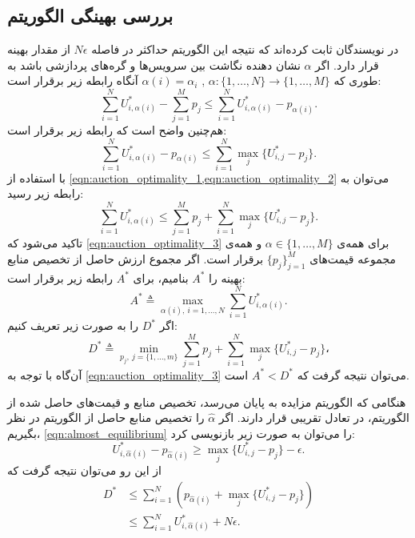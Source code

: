    \subsection{بررسی بهینگی الگوریتم}
      در \cite{distributed_auction_algorithms_zavlanos} نویسندگان ثابت کرده‌اند که نتیجه این الگوریتم حداکثر در فاصله $N\epsilon$ از مقدار بهینه قرار دارد.
      اگر $\alpha$ نشان دهنده نگاشت بین سرویس‌ها و گره‌های پردازشی باشد به طوری که $\alpha: \{1, \hdots, N\} \rightarrow \{1, \hdots, M\}$ , $\alpha(i) = \alpha_i$ آنگاه رابطه زیر برقرار است:
      \begin{equation}\label{eqn:auction_optimality_1}
        \sum_{i=1}^N U_{i,\alpha(i)}^* - \sum_{j=1}^M p_j \le \sum_{i=1}^N U_{i,\alpha(i)}^* - p_{\alpha(i)}.
      \end{equation}
      هم‌چنین واضح است که رابطه زیر برقرار است:
      \begin{equation}\label{eqn:auction_optimality_2}
        \sum_{i=1}^N U_{i,\alpha(i)}^* - p_{\alpha(i)} \le \sum_{i=1}^N \max_j\{U_{i,j}^* - p_j\}.
      \end{equation}
      با استفاده از \cref{eqn:auction_optimality_1,eqn:auction_optimality_2} می‌توان به رابطه زیر رسید:
      \begin{equation}\label{eqn:auction_optimality_3}
        \sum_{i=1}^N U_{i,\alpha(i)}^* \le \sum_{j=1}^M p_j + \sum_{i=1}^N \max_j\{U_{i,j}^* - p_j\}.
      \end{equation}
      تاکید می‌شود که \cref{eqn:auction_optimality_3} برای همه‌ی $\alpha \in \{1,\hdots,M\}$ و همه‌ی مجموعه قیمت‌های $\{p_j\}_{j=1}^M$ برقرار است.
      اگر مجموع ارزش حاصل از تخصیص منابع بهینه را $A^*$ بنامیم، برای $A^*$ رابطه زیر برقرار است:
      \begin{equation}\label{eqn:auction_optimality_A_defenition}
        A^* \triangleq \max_{\alpha(i),~i=1, \hdots, N} \sum_{i=1}^N U_{i, \alpha(i)}^*.
      \end{equation}
      اگر $D^*$ را به صورت زیر تعریف ‌کنیم:
      \begin{equation}\label{eqn:auction_optimality_D_defenition}
        D^* \triangleq \min_{p_j,~j=\{1, \hdots, m\}} \sum_{j=1}^M p_j + \sum_{i=1}^N \max_j\{U_{i,j}^* - p_j\}،
      \end{equation}
      آن‌گاه با توجه به \cref{eqn:auction_optimality_3} می‌توان نتیجه گرفت که $A^*<D^*$ است.
      
      هنگامی که الگوریتم مزایده به پایان می‌رسد، تخصیص منابع و قیمت‌های حاصل شده از الگوریتم، در تعادل تقریبی قرار دارند.
      اگر $\hat \alpha$ را تخصیص منابع حاصل از الگوریتم در نظر بگیریم، \cref{eqn:almost_equilibrium} را می‌توان به صورت زیر باز‌نویسی کرد:
      \begin{equation}\label{eqn:auction_almost_equilibrium2}
        U_{i, \hat \alpha(i)}^* - p_{\hat \alpha(i)} \ge \max_j \{U_{i,j}^*-p_j\}-\epsilon.
      \end{equation}
      از این رو می‌توان نتیجه گرفت که
      \begin{align}
        D^* & \le \sum_{i=1}^N \left(p_{\hat \alpha (i)}+\max_j\{U_{i,j}^*-p_j\}\right) \\
            & \le \sum_{i=1}^N U_{i, \hat \alpha (i)}^* + N \epsilon \label{eqn:auction_D_upper_bound}.
      \end{align}

